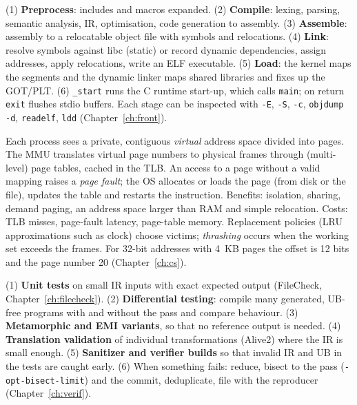 \documentclass[10pt,a4paper,openany,oneside]{report}
\begin{document}
\begin{exbox}
(1) \textbf{Preprocess}: includes and macros expanded. (2) \textbf{Compile}: lexing, parsing, semantic analysis, IR, optimisation, code generation to assembly. (3) \textbf{Assemble}: assembly to a relocatable object file with symbols and relocations. (4) \textbf{Link}: resolve symbols against libc (static) or record dynamic dependencies, assign addresses, apply relocations, write an ELF executable. (5) \textbf{Load}: the kernel maps the segments and the dynamic linker maps shared libraries and fixes up the GOT/PLT. (6) \texttt{\_start} runs the C runtime start-up, which calls \texttt{main}; on return \texttt{exit} flushes stdio buffers. Each stage can be inspected with \texttt{-E}, \texttt{-S}, \texttt{-c}, \texttt{objdump -d}, \texttt{readelf}, \texttt{ldd} (Chapter~\ref{ch:front}).
\end{exbox}
\begin{exbox}
Each process sees a private, contiguous \emph{virtual} address space divided into pages. The MMU translates virtual page numbers to physical frames through (multi-level) page tables, cached in the TLB. An access to a page without a valid mapping raises a \emph{page fault}; the OS allocates or loads the page (from disk or the file), updates the table and restarts the instruction. Benefits: isolation, sharing, demand paging, an address space larger than RAM and simple relocation. Costs: TLB misses, page-fault latency, page-table memory. Replacement policies (LRU approximations such as clock) choose victims; \emph{thrashing} occurs when the working set exceeds the frames. For 32-bit addresses with 4~KB pages the offset is 12 bits and the page number 20 (Chapter~\ref{ch:cs}).
\end{exbox}
\begin{exbox}
(1) \textbf{Unit tests} on small IR inputs with exact expected output (FileCheck, Chapter~\ref{ch:filecheck}). (2) \textbf{Differential testing}: compile many generated, UB-free programs with and without the pass and compare behaviour. (3) \textbf{Metamorphic and EMI variants}, so that no reference output is needed. (4) \textbf{Translation validation} of individual transformations (Alive2) where the IR is small enough. (5) \textbf{Sanitizer and verifier builds} so that invalid IR and UB in the tests are caught early. (6) When something fails: reduce, bisect to the pass (\texttt{-opt-bisect-limit}) and the commit, deduplicate, file with the reproducer (Chapter~\ref{ch:verif}).
\end{exbox}
\end{document}
